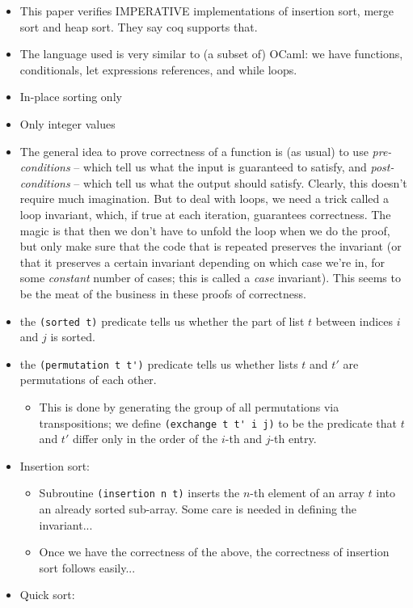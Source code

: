 \begin{itemize}
	\item This paper verifies IMPERATIVE implementations of insertion sort, merge sort and heap sort. They say coq supports that.
	\item The language used is very similar to (a subset of) OCaml: we have functions, conditionals, let expressions references, and while loops.
	\item In-place sorting only
	\item Only integer values
	\item The general idea to prove correctness of a function is (as usual) to use \emph{pre-conditions} -- which tell us what the input is guaranteed to satisfy, and \emph{post-conditions} -- which tell us what the output should satisfy. Clearly, this doesn't require much imagination. But to deal with loops, we need a trick called a loop invariant, which, if true at each iteration, guarantees correctness. The magic is that then we don't have to unfold the loop when we do the proof, but only make sure that the code that is repeated preserves the invariant (or that it preserves a certain invariant depending on which case we're in, for some \emph{constant} number of cases; this is called a \emph{case} invariant). This seems to be the meat of the business in these proofs of correctness.
	\item the \verb|(sorted t)| predicate tells us whether the part of list $t$ between indices $i$ and $j$ is sorted.
	\item the \verb|(permutation t t')| predicate tells us whether lists $t$ and $t'$ are permutations of each other.
	\begin{itemize}
	\item This is done by generating the group of all permutations via transpositions; we define \verb|(exchange t t' i j)| to be the predicate that $t$ and $t'$ differ only in the order of the $i$-th and $j$-th entry.		
\end{itemize}
\item Insertion sort: 
\begin{itemize}
	\item Subroutine \verb|(insertion n t)| inserts the $n$-th element of an array $t$ into an already sorted sub-array. Some care is needed in defining the invariant...
	\item Once we have the correctness of the above, the correctness of insertion sort follows easily...
\end{itemize}
\item Quick sort:

\end{itemize}
